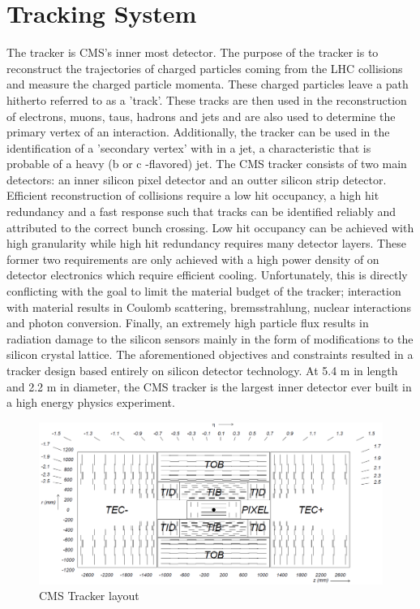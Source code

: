 \documentclass[oneside, letterpaper, 12pt, oldfontcommands]{memoir}
\begin{document}
\section{Tracking System}
The tracker is CMS's inner most detector. The purpose of the tracker is to reconstruct the
trajectories of charged particles coming from the LHC collisions and measure the charged particle momenta.
These charged particles leave a path hitherto referred to as a 'track'.%
These tracks are then used in the reconstruction of electrons, muons, taus, hadrons and jets 
and are also used to determine the primary vertex of an interaction. Additionally,
the tracker can be used in the identification of a 'secondary vertex' with in a jet,
a characteristic %
that is probable%
of a heavy (b or c -flavored) jet.
The CMS tracker consists of two main detectors: an inner silicon pixel detector and an outter
silicon strip detector.%
Efficient reconstruction of collisions require a low hit occupancy, a high hit redundancy and a
fast response such that tracks can be identified reliably and attributed to the correct bunch crossing.
Low hit occupancy can be achieved with high granularity while high hit redundancy requires
many detector layers. These former two requirements are only achieved with a 
high power density of on detector electronics which require efficient cooling. %
Unfortunately, this is directly conflicting with the goal to limit the material 
budget of the tracker; interaction with material results in Coulomb scattering,
bremsstrahlung, nuclear interactions and photon conversion. Finally, an extremely
high particle flux results in radiation damage to the silicon sensors mainly 
in the form of modifications to the silicon crystal lattice. %
The aforementioned objectives and constraints resulted in a tracker design 
based entirely on silicon detector technology. 
At 5.4 m in length and 2.2 m in diameter, the CMS tracker is the largest inner
detector ever built in a high energy physics experiment.
\begin{figure}[hb]
  \centering
	\includegraphics[width=1\textwidth]{trackerImages/trackerLayout.png}
  	\caption[CMS Tracker Layout]
   	{CMS Tracker layout}
	\label{fig:trackerLayout}
\end{figure}
\end{document}
